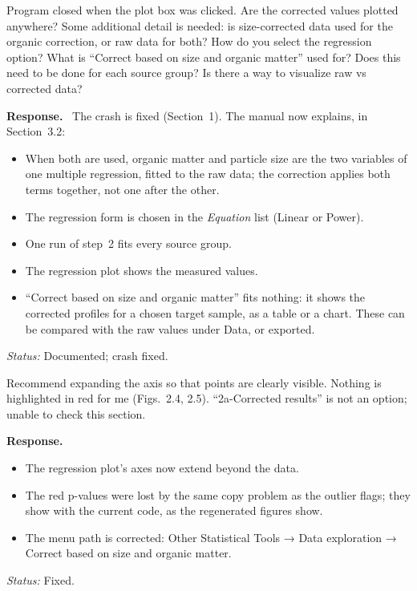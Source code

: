 \documentclass[11pt]{article}
\newcounter{cmt}
\newcounter{grp}
\renewcommand{\thecmt}{\thegrp.\arabic{cmt}}
\newenvironment{reviewer}[1]{%
  \refstepcounter{cmt}%
  \begin{tcolorbox}[enhanced,breakable,colback=commentbg,colframe=usgsgreen!60,
    boxrule=0.4pt,left=6pt,right=6pt,top=4pt,bottom=4pt,
    title={\small\textbf{Comment \thecmt}\hfill\textit{#1}},
    coltitle=black,colbacktitle=usgsgreen!15,fonttitle=\small]}%
  {\end{tcolorbox}}
\newenvironment{response}{\par\noindent\textbf{Response.}\ }{\par\medskip}
\newcommand{\status}[1]{\par\noindent\textit{Status:} #1\par}
\begin{document}
\begin{reviewer}{Organic matter and particle size correction}
Program closed when the plot box was clicked. Are the corrected values plotted
anywhere? Some additional detail is needed: is size-corrected data used for the
organic correction, or raw data for both? How do you select the regression
option? What is ``Correct based on size and organic matter'' used for? Does
this need to be done for each source group? Is there a way to visualize raw vs
corrected data?
\end{reviewer}
\begin{response}
The crash is fixed (Section~1). The manual now explains, in Section~3.2:
\begin{itemize}
    \item When both are used, organic matter and particle size are the two
          variables of one multiple regression, fitted to the raw data; the
          correction applies both terms together, not one after the other.
    \item The regression form is chosen in the \textit{Equation} list
          (Linear or Power).
    \item One run of step~2 fits every source group.
    \item The regression plot shows the measured values.
    \item ``Correct based on size and organic matter'' fits nothing: it shows
          the corrected profiles for a chosen target sample, as a table or a
          chart. These can be compared with the raw values under Data, or
          exported.
\end{itemize}
\end{response}
\status{Documented; crash fixed.}

\begin{reviewer}{Organic matter and particle size correction}
Recommend expanding the axis so that points are clearly visible. Nothing is
highlighted in red for me (Figs.~2.4, 2.5). ``2a-Corrected results'' is not an
option; unable to check this section.
\end{reviewer}
\begin{response}
\begin{itemize}
    \item The regression plot's axes now extend beyond the data.
    \item The red p-values were lost by the same copy problem as the outlier
          flags; they show with the current code, as the regenerated figures
          show.
    \item The menu path is corrected: Other Statistical Tools → Data
          exploration → Correct based on size and organic matter.
\end{itemize}
\end{response}
\status{Fixed.}
\end{document}
